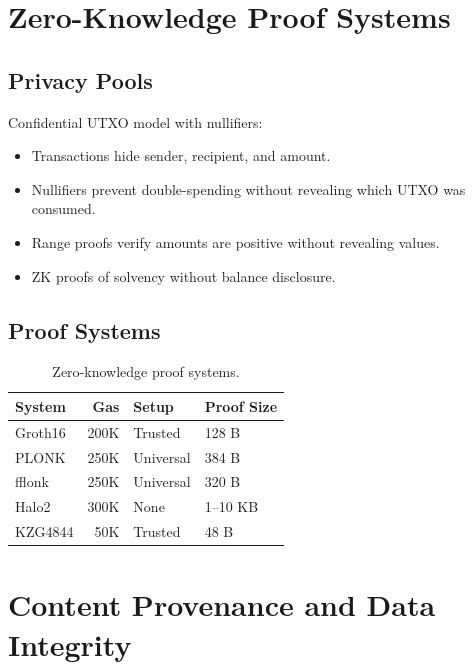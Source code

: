 \documentclass[11pt,letterpaper]{article}
\begin{document}
\section{Zero-Knowledge Proof Systems}

\subsection{Privacy Pools}

Confidential UTXO model with nullifiers:
\begin{itemize}
\item Transactions hide sender, recipient, and amount.
\item Nullifiers prevent double-spending without revealing which UTXO was consumed.
\item Range proofs verify amounts are positive without revealing values.
\item ZK proofs of solvency without balance disclosure.
\end{itemize}

\subsection{Proof Systems}

\begin{table}[H]
\centering
\begin{tabular}{@{}lrll@{}}
\toprule
\textbf{System} & \textbf{Gas} & \textbf{Setup} & \textbf{Proof Size} \\
\midrule
Groth16 & 200K & Trusted & 128 B \\
PLONK & 250K & Universal & 384 B \\
fflonk & 250K & Universal & 320 B \\
Halo2 & 300K & None & 1--10 KB \\
KZG4844 & 50K & Trusted & 48 B \\
\bottomrule
\end{tabular}
\caption{Zero-knowledge proof systems.}
\label{tab:zk-systems}
\end{table}

\section{Content Provenance and Data Integrity}
\end{document}
